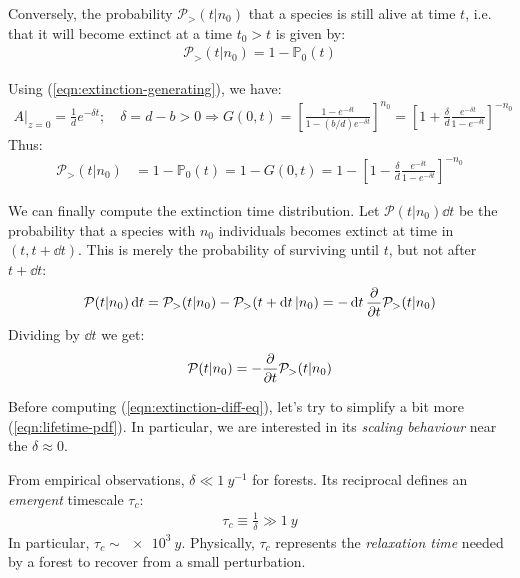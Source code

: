 \documentclass[../../main.tex]{subfiles}
\begin{document}
Conversely, the probability $\mathcal{P}_>(t|n_0)$ that a species is still alive at time $t$, i.e. that it will become extinct at a time $t_0 > t$ is given by:
\begin{align*}
    \mathcal{P}_>(t|n_0) = 1 - \mathbb{P}_0(t)
\end{align*}

Using (\ref{eqn:extinction-generating}), we have:
\begin{align*}
    A\Big|_{z=0} = \frac{1}{d} e^{-\delta t}; \quad \delta = d-b > 0  \Rightarrow G(0,t) = \left[\frac{1 - e^{-\delta t}}{1 - (b/d) e^{-\delta t}} \right]^{n_0} = \left[1 + \frac{\delta}{d} \frac{e^{-\delta t}}{1 - e^{-\delta t}}  \right]^{-n_0}
\end{align*}
Thus:
\begin{align}\label{eqn:lifetime-pdf}
    \mathcal{P}_>(t|n_0) &= 1- \mathbb{P}_0(t) = 1 - G(0,t) = 1 - \left[1- \frac{\delta}{d} \frac{e^{-\delta t}}{1 - e^{-\delta t}}  \right]^{-n_0}
\end{align}

We can finally compute the extinction time distribution. Let $\mathcal{P}(t|n_0) \dd{t}$ be the probability that a species with $n_0$ individuals becomes extinct at time in $(t, t+ \dd{t})$. This is merely the probability of surviving until $t$, but not after $t+ \dd{t}$:
\begin{align}\label{eqn:lifetime-derivative}
    \mathcal{P}(t|n_0)\dd{t} = \mathcal{P}_>(t|n_0) - \mathcal{P}_>(t+\dd{t}|n_0) = - \dd{t} \pdv{t} \mathcal{P}_>(t|n_0)
\end{align}
Dividing by $\dd{t}$ we get:
\begin{align}\label{eqn:extinction-diff-eq}
    \mathcal{P}(t|n_0) = -\pdv{t} \mathcal{P}_>(t|n_0)
\end{align}


Before computing (\ref{eqn:extinction-diff-eq}), let's try to simplify a bit more (\ref{eqn:lifetime-pdf}). In particular, we are interested in its \textit{scaling behaviour} near the  $\delta \approx 0$.

\medskip

From empirical observations, $\delta \ll \SI{1}{y^{-1}}$ for forests. Its reciprocal defines an \textit{emergent} timescale $\tau_c$:
\begin{align}\label{eqn:tau-c}
    \tau_c \equiv \frac{1}{\delta}  \gg \SI{1}{y}
\end{align} 
In particular, $\tau_c \sim \SI{e3}{y}$. Physically, $\tau_c$ represents the \textit{relaxation time} needed by a forest to recover from a small perturbation. 
\end{document}
